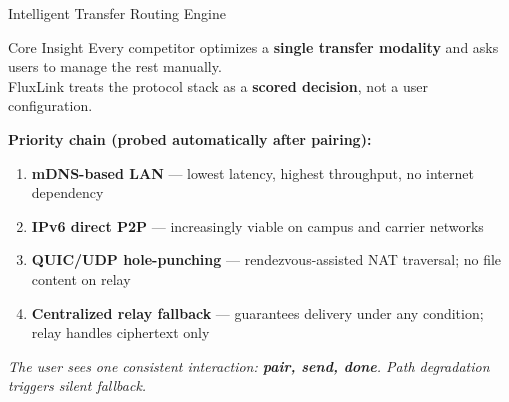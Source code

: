 \documentclass[xcolor=table,dvipsnames,svgnames,aspectratio=169]{beamer}
\begin{document}
\begin{frame}[shrink=22]{Intelligent Transfer Routing Engine}
  \begin{block}{Core Insight}
    Every competitor optimizes a \textbf{single transfer modality} and asks users to manage the rest manually.\\
    FluxLink treats the protocol stack as a \textbf{scored decision}, not a user configuration.
  \end{block}

  \vspace{0.5em}

  \textbf{Priority chain (probed automatically after pairing):}

  \vspace{0.3em}

  \begin{enumerate}
    \item \textbf{mDNS-based LAN} --- lowest latency, highest throughput, no internet dependency
    \item \textbf{IPv6 direct P2P} --- increasingly viable on campus and carrier networks
    \item \textbf{QUIC/UDP hole-punching} --- rendezvous-assisted NAT traversal; no file content on relay
    \item \textbf{Centralized relay fallback} --- guarantees delivery under any condition; relay handles ciphertext only
  \end{enumerate}

  \vspace{0.5em}
  \textit{The user sees one consistent interaction: \textbf{pair, send, done}. Path degradation triggers silent fallback.}
\end{frame}
\end{document}
